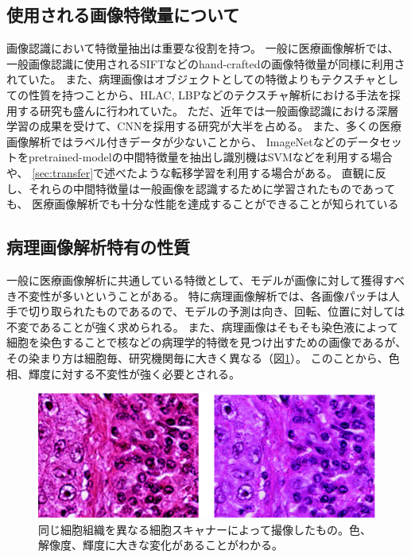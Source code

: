 \subsection{使用される画像特徴量について}
画像認識において特徴量抽出は重要な役割を持つ。
一般に医療画像解析では、一般画像認識に使用されるSIFTなどのhand-craftedの画像特徴量が同様に利用されていた\cite{caicedo2009histopathology}。
また、病理画像はオブジェクトとしての特徴よりもテクスチャとしての性質を持つことから、HLAC, LBPなどのテクスチャ解析における手法を採用する研究も盛んに行われていた\cite{sertel2008texture, sertel2009histopathological, nosato2011extended}。
ただ、近年では一般画像認識における深層学習の成果を受けて、CNNを採用する研究が大半を占める。
また、多くの医療画像解析ではラベル付きデータが少ないことから、
ImageNetなどのデータセットをpretrained-modelの中間特徴量を抽出し識別機はSVMなどを利用する場合や、
\ref{sec:transfer}で述べたような転移学習を利用する場合がある。
直観に反し、それらの中間特徴量は一般画像を認識するために学習されたものであっても、
医療画像解析でも十分な性能を達成することができることが知られている\cite{li2014medical, tajbakhsh2016convolutional}

\subsection{病理画像解析特有の性質}
一般に医療画像解析に共通している特徴として、モデルが画像に対して獲得すべき不変性が多いということがある。
特に病理画像解析では、各画像パッチは人手で切り取られたものであるので、モデルの予測は向き、回転、位置に対しては不変であることが強く求められる。
また、病理画像はそもそも染色液によって細胞を染色することで核などの病理学的特徴を見つけ出すための画像であるが、
その染まり方は細胞毎、研究機関毎に大きく異なる（図\ref{fig:comparison_color}）。
このことから、色相、輝度に対する不変性が強く必要とされる。

\begin{figure}[tbp]
     \begin{center}
      \includegraphics[width=13cm]{figures/comparison_color.pdf}
     \end{center}
    \caption{\label{fig:comparison_color}同じ細胞組織を異なる細胞スキャナーによって撮像したもの。色、解像度、輝度に大きな変化があることがわかる。}
\end{figure}


